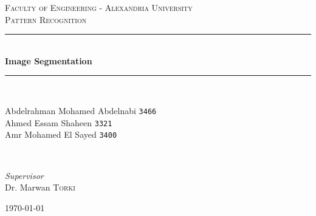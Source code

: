 \documentclass{article}
\begin{document}
\begin{titlepage} %
		\newcommand{\HRule}{\rule{\linewidth}{0.5mm}} %
		
		\center %
		
		
		\textsc{\LARGE Faculty of Engineering - Alexandria University}\\[1.5cm] %
		
		\textsc{\Large Pattern Recognition}\\[0.5cm] %
		

		\HRule\\[0.4cm]
		
		{\huge\bfseries Image Segmentation}\\[0.4cm] %
		
		\HRule\\[1.5cm]
		
		
		\begin{minipage}{0.5\textwidth}
			\begin{flushleft}
				\large
				Abdelrahman Mohamed Abdelnabi
				\texttt{3466} \\
				Ahmed Essam Shaheen
				\texttt{3321} \\
				Amr Mohamed El Sayed
				\texttt{3400} \\
			\end{flushleft}
		\end{minipage}
		~
		\begin{minipage}{0.3\textwidth}
			\begin{flushright}
				\large
				\textit{Supervisor}\\
				Dr. Marwan \textsc{Torki} %
			\end{flushright}
		\end{minipage}


		\vfill\vfill\vfill %
		
		{\large\today} %
		
		\vfill %
		
	\end{titlepage}
	
\end{document}
